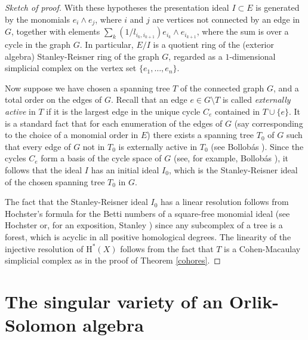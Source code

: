 \documentclass{tran-l}
\theoremstyle{definition}
\theoremstyle{remark}
\newcommand{\rH}{{\mathrm H}}
\begin{document}
\begin{proof}[Sketch of proof]
With these hypotheses the presentation ideal $I\subset E$ is 
generated by the monomials 
$e_i\wedge e_j$, where $i$ and $j$ are vertices not connected by an 
edge in $G$, together with elements
$\sum_k (1/l_{i_k,i_{k+1}})e_{i_k}\wedge e_{i_{k+1}}$, where the
sum is over a cycle in the graph $G$. In particular, $E/I$ is a
quotient ring of the  (exterior algebra) Stanley-Reisner ring of the
graph $G$, regarded as a $1$-dimensional simplicial complex on the vertex
set $\{e_1,\ldots,e_n\}$.
  
Now suppose we have chosen a spanning tree $T$ of the connected graph
$G$,  and a total order on the edges of $G$. Recall that an edge $e\in
G\setminus T$ is called {\it externally active} in $T$ if it is the
largest edge in the unique cycle $C_e$ contained in $T\cup \{e\}$. It is
a standard fact that for each enumeration of the edges of $G$ (say
corresponding to  the choice of a monomial order in $E$) there exists a
spanning tree $T_0$ of $G$ such that every edge of $G$ not in $T_0$ is
externally active in $T_0$ (see Bollob\'as \cite[proof of Theorem 10,
p. 351 and Exercise 8, p. 372]{Bo}). Since the  cycles $C_e$
form a basis of the cycle space of $G$ (see, for
example, Bollob\'as \cite[proof of Theorem 9, p. 53]{Bo}), it follows that  
the ideal $I$ has an initial ideal $I_0$, which is the Stanley-Reisner 
ideal of the chosen spanning tree $T_0$ in $G$. 

The fact that the Stanley-Reisner ideal
$I_0$ has a linear resolution follows from Hochster's
formula for the Betti numbers of a square-free monomial ideal (see
Hochster \cite{Ho2} or, for an exposition, Stanley \cite{St1}) since any
subcomplex of a tree is a forest, which is acyclic in all positive
homological degrees. The  linearity of the injective resolution of
$\rH^*(X)$ follows from the fact that 
$T$ is a Cohen-Macaulay simplicial complex as in the proof of
Theorem \ref{cohores}.\end{proof}



\section{The singular variety of an Orlik-Solomon algebra}\label{OSrank-var}
\end{document}
